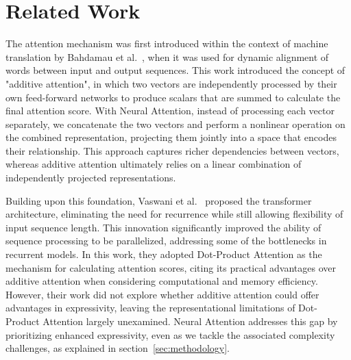 \section{Related Work}
\label{sec:related_work}
The attention mechanism was first introduced within the context of machine translation by Bahdamau et al.~\cite{bahdanau2014neural}, when it was used for dynamic alignment of words between input and output sequences. This work introduced the concept of "additive attention", in which two vectors are independently processed by their own feed-forward networks to produce scalars that are summed to calculate the final attention score. With Neural Attention, instead of processing each vector separately, we concatenate the two vectors and perform a nonlinear operation on the combined representation, projecting them jointly into a space that encodes their relationship. This approach captures richer dependencies between vectors, whereas additive attention ultimately relies on a linear combination of independently projected representations.

Building upon this foundation, Vaswani et al.~\cite{vaswani2017attention} proposed the transformer architecture, eliminating the need for recurrence while still allowing flexibility of input sequence length. This innovation significantly improved the ability of sequence processing to be parallelized, addressing some of the bottlenecks in recurrent models. In this work, they adopted Dot-Product Attention as the mechanism for calculating attention scores, citing its practical advantages over additive attention when considering computational and memory efficiency. However, their work did not explore whether additive attention could offer advantages in expressivity, leaving the representational limitations of Dot-Product Attention largely unexamined. Neural Attention addresses this gap by prioritizing enhanced expressivity, even as we tackle the associated complexity challenges, as explained in section~\ref{sec:methodology}.

